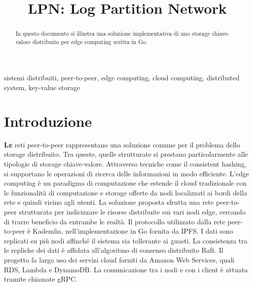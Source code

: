 \documentclass[conference]{IEEEtran}
\begin{document}
\title{LPN: Log Partition Network}

\author{
}


\maketitle

\begin{abstract}
In questo documento si illustra una soluzione implementativa di uno storage chiave-valore distribuito per edge computing scritta in Go.
\end{abstract}

\begin{IEEEkeywords}
sistemi distribuiti, peer-to-peer, edge computing, cloud computing, distributed system, key-value storage
\end{IEEEkeywords}

\section{Introduzione}
\lettrine{\textbf{L}}{\textbf{e}} reti peer-to-peer rappresentano una soluzione comune per il problema dello storage distribuito.
Tra queste, quelle strutturate si prestano particolarmente alle tipologie di storage chiave-valore.
Attraverso tecniche come il consistent hashing, si supportano le operazioni di ricerca delle informazioni in modo efficiente.\cite{p2pLookup}
L'edge computing è un paradigma di computazione che estende il cloud tradizionale con le funzionalità di computazione e
storage offerte da nodi localizzati ai bordi della rete e quindi vicino agli utenti. La soluzione proposta sfrutta una
rete peer-to-peer strutturata per indicizzare le risorse distribuite sui vari nodi edge, cercando di trarre beneficio da entrambe le realtà.
Il protocollo utilizzato dalla rete peer-to-peer è Kademlia,\cite{kademlia} nell'implementazione in Go fornita da IPFS\cite{kadDHT}.
I dati sono replicati su più nodi affinché il sistema sia tollerante ai guasti.
La consistenza tra le repliche dei dati è affidata all'algoritmo di consenso distribuito Raft.\cite{raft}\cite{raftGolang}
Il progetto fa largo uso dei servizi cloud forniti da Amazon Web Services, quali RDS, Lambda e DynamoDB.
La comunicazione tra i nodi e con i client è attuata tramite chiamate gRPC.
\end{document}
